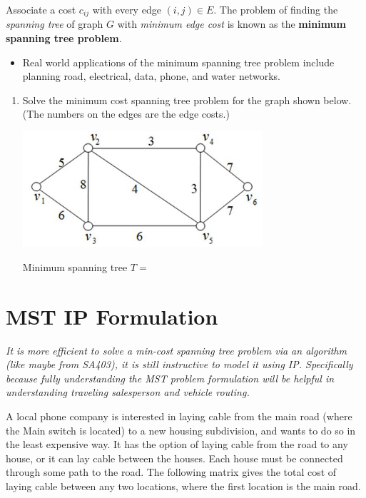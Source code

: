 \documentclass[11pt]{article}
\theoremstyle{definition}
\begin{document}
\begin{tcolorbox}
Associate a cost $c_{ij}$ with every edge $(i,j) \in E$. The problem of finding the \emph{spanning tree} of graph $G$ with \emph{minimum edge cost} is known as the \textbf{minimum spanning tree problem}.
\end{tcolorbox}

\begin{itemize}
\item  Real world applications of the minimum spanning tree problem include planning road, electrical, data, phone, and water networks.  
\end{itemize}

\bigskip

\begin{enumerate}[resume]
\item  Solve the minimum cost spanning tree problem for the graph shown below.  (The numbers on the edges are the edge costs.)

\begin{center}
\includegraphics[width = 0.7\textwidth]{weightedgraph}
\end{center}

Minimum spanning tree $T =$ 


\end{enumerate}


\newpage
\section{MST IP Formulation}
\emph{It is more efficient to solve a min-cost spanning tree problem via an algorithm (like maybe from SA403), it is still instructive to model it using IP. Specifically because fully understanding the MST problem formulation will be helpful in understanding traveling salesperson and vehicle routing.}

A local phone company is interested in laying cable from the main road (where the
Main switch is located) to a new housing subdivision, and wants to do so in the least
expensive way.  It has the option of laying cable from the road to any house, or it can 
lay cable between the houses.  Each house must be connected through some path to 
the road.  The following matrix gives the total cost of laying cable between any two
locations, where the first location is the main road.
\end{document}
